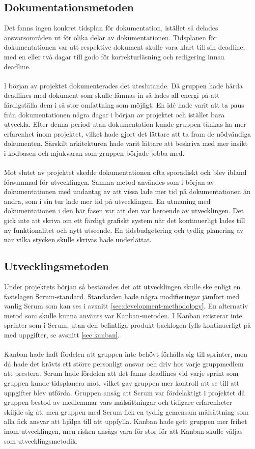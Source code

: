 \subsection{Dokumentationsmetoden}
Det fanns ingen konkret tidsplan för dokumentation, istället så delades ansvarsområden ut för olika delar av dokumentationen. Tidsplanen för dokumentationen var att respektive dokument skulle vara klart till sin deadline, med en eller två dagar till godo för korrekturläsning och redigering innan deadline.
\\ \\ 
I början av projektet dokumenterades det uteslutande. Då gruppen hade hårda deadlines med dokument som skulle lämnas in så lades all energi på att färdigställa dem i så stor omfattning som möjligt. En idé hade varit att ta paus från dokumentationen några dagar i början av projektet och istället bara utveckla. Efter denna period utan dokumentation kunde gruppen tänkas ha mer erfarenhet inom projektet, vilket hade gjort det lättare att ta fram de nödvändiga dokumenten. Särskilt arkitekturen hade varit lättare att beskriva med mer insikt i kodbasen och mjukvaran som gruppen började jobba med.
\\ \\
Mot slutet av projektet skedde dokumentationen ofta sporadiskt och blev ibland försummad för utvecklingen. Samma metod användes som i början av dokumentationen med undantag av att vissa lade mer tid på dokumentationen än andra, som i sin tur lade mer tid på utvecklingen. En utmaning med dokumentationen i den här fasen var att den var beroende av utvecklingen. Det gick inte att skriva om ett färdigt grafiskt system när det kontinuerligt lades till ny funktionalitet och nytt utseende. En tidsbudgetering och tydlig planering av när vilka stycken skulle skrivas hade underlättat.

\subsection{Utvecklingsmetoden}
Under projektets början så bestämdes det att utvecklingen skulle ske enligt en fastslagen Scrum-standard. Standarden hade några modifieringar jämfört med vanlig Scrum som kan ses i avsnitt \ref{sec:development-methodology}. En alternativ metod som skulle kunna använts var Kanban-metoden. I Kanban existerar inte sprinter som i Scrum, utan den befintliga produkt-backlogen fylls kontinuerligt på med uppgifter, se avsnitt \ref{sec:kanban}.
\\ \\
Kanban hade haft fördelen att gruppen inte behövt förhålla sig till sprinter, men då hade det krävts ett större personligt ansvar och driv hos varje gruppmedlem att prestera. Scrum hade fördelen att det fanns deadlines vid varje sprint som gruppen kunde tidsplanera mot, vilket gav gruppen mer kontroll att se till att uppgifter blev utförda. Gruppen ansåg att Scrum var fördelaktigt i projektet då gruppen bestod av medlemmar vars målsättningar och tidigare erfarenheter skiljde sig åt, men gruppen med Scrum fick en tydlig gemensam målsättning som alla fick ansvar att hjälpa till att uppfylla. Kanban hade gett gruppen mer frihet inom utvecklingen, men risken ansågs vara för stor för att Kanban skulle väljas som utvecklingsmetodik.

